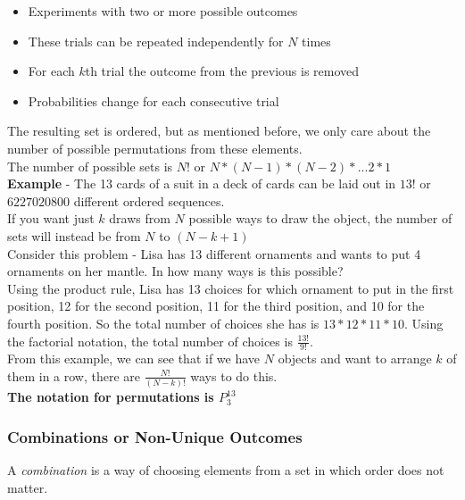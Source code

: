 \documentclass[11pt]{article}
\begin{document}
\begin{itemize}
    \item Experiments with two or more possible outcomes
    \item These trials can be repeated independently for $N$ times
    \item For each $k$th trial the outcome from the previous is removed
    \item Probabilities change for each consecutive trial
\end{itemize}

The resulting set is ordered, but as mentioned before, we only care about the number of possible permutations from these elements. \\

The number of possible sets is $N!$ or $N * (N-1) * (N-2) * ... 2 * 1$ \\

\textbf{Example} - The 13 cards of a suit in a deck of cards can be laid out in $13!$ or $6227020800$ different ordered sequences. \\

If you want just $k$ draws from $N$ possible ways to draw the object, the number of sets will instead be from $N$ to $(N-k+1)$ \\

Consider this problem - Lisa has 13 different ornaments and wants to put 4 ornaments on her mantle. In how many ways is this possible? \\


Using the product rule, Lisa has 13 choices for which ornament to put in the first position, 12 for the second position, 11 for the third position, and 10 for the fourth position. So the total number of choices she has is $13 * 12 * 11 * 10$. Using the factorial notation, the total number of choices is $\frac{13!}{9!}$. \\

From this example, we can see that if we have $N$ objects and want to arrange $k$ of them in a row, there are $\frac{N!}{(N-k)!}$ ways to do this. \\

\textbf{The notation for permutations is $P^{13}_3$}
\subsubsection{Combinations or Non-Unique Outcomes}

A \textit{combination} is a way of choosing elements from a set in which order does not matter. \\
\end{document}
